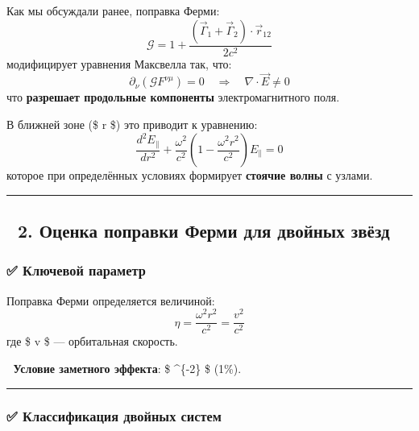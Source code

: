 \documentclass[11pt]{article}
\begin{document}
Как мы обсуждали ранее, поправка Ферми: \[
\mathcal{G} = 1 + \frac{(\vec{\Gamma}_1 + \vec{\Gamma}_2) \cdot \vec{r}_{12}}{2c^2}
\] модифицирует уравнения Максвелла так, что: \[
\partial_\nu (\mathcal{G} F^{\nu\mu}) = 0 \quad \Rightarrow \quad \nabla \cdot \vec{E} \neq 0
\] что \textbf{разрешает продольные компоненты} электромагнитного поля.

В ближней зоне (\$ r \ll \lambda \$) это приводит к уравнению: \[
\frac{d^2 E_{\parallel}}{dr^2} + \frac{\omega^2}{c^2} \left( 1 - \frac{\omega^2 r^2}{c^2} \right) E_{\parallel} = 0
\] которое при определённых условиях формирует \textbf{стоячие волны} с
узлами.

\begin{center}\rule{0.5\linewidth}{\linethickness}\end{center}

\subsection{🔹 2. Оценка поправки Ферми для двойных
звёзд}\label{ux43eux446ux435ux43dux43aux430-ux43fux43eux43fux440ux430ux432ux43aux438-ux444ux435ux440ux43cux438-ux434ux43bux44f-ux434ux432ux43eux439ux43dux44bux445-ux437ux432ux451ux437ux434}

\subsubsection{✅ Ключевой
параметр}\label{ux43aux43bux44eux447ux435ux432ux43eux439-ux43fux430ux440ux430ux43cux435ux442ux440}

Поправка Ферми определяется величиной: \[
\eta = \frac{\omega^2 r^2}{c^2} = \frac{v^2}{c^2}
\] где \$ v \$ --- орбитальная скорость.

📌 \textbf{Условие заметного эффекта}: \$ \eta {}\^{}\{-2\} \$
(1\%).

\begin{center}\rule{0.5\linewidth}{\linethickness}\end{center}

\subsubsection{✅ Классификация двойных
систем}\label{ux43aux43bux430ux441ux441ux438ux444ux438ux43aux430ux446ux438ux44f-ux434ux432ux43eux439ux43dux44bux445-ux441ux438ux441ux442ux435ux43c}
\end{document}

